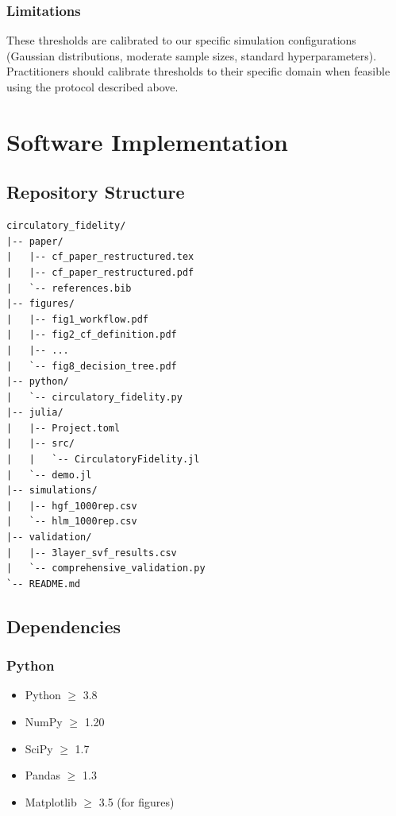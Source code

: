 \documentclass[10pt]{article} %
\theoremstyle{plain}
\theoremstyle{definition}
\begin{document}
\subsubsection{Limitations}

These thresholds are calibrated to our specific simulation configurations (Gaussian distributions, moderate sample sizes, standard hyperparameters). Practitioners should calibrate thresholds to their specific domain when feasible using the protocol described above.


\section{Software Implementation}
\label{app:software}

\subsection{Repository Structure}

\begin{verbatim}
circulatory_fidelity/
|-- paper/
|   |-- cf_paper_restructured.tex
|   |-- cf_paper_restructured.pdf
|   `-- references.bib
|-- figures/
|   |-- fig1_workflow.pdf
|   |-- fig2_cf_definition.pdf
|   |-- ...
|   `-- fig8_decision_tree.pdf
|-- python/
|   `-- circulatory_fidelity.py
|-- julia/
|   |-- Project.toml
|   |-- src/
|   |   `-- CirculatoryFidelity.jl
|   `-- demo.jl
|-- simulations/
|   |-- hgf_1000rep.csv
|   `-- hlm_1000rep.csv
|-- validation/
|   |-- 3layer_svf_results.csv
|   `-- comprehensive_validation.py
`-- README.md
\end{verbatim}

\subsection{Dependencies}

\subsubsection{Python}
\begin{itemize}
\item Python $\geq$ 3.8
\item NumPy $\geq$ 1.20
\item SciPy $\geq$ 1.7
\item Pandas $\geq$ 1.3
\item Matplotlib $\geq$ 3.5 (for figures)
\end{itemize}
\end{document}
